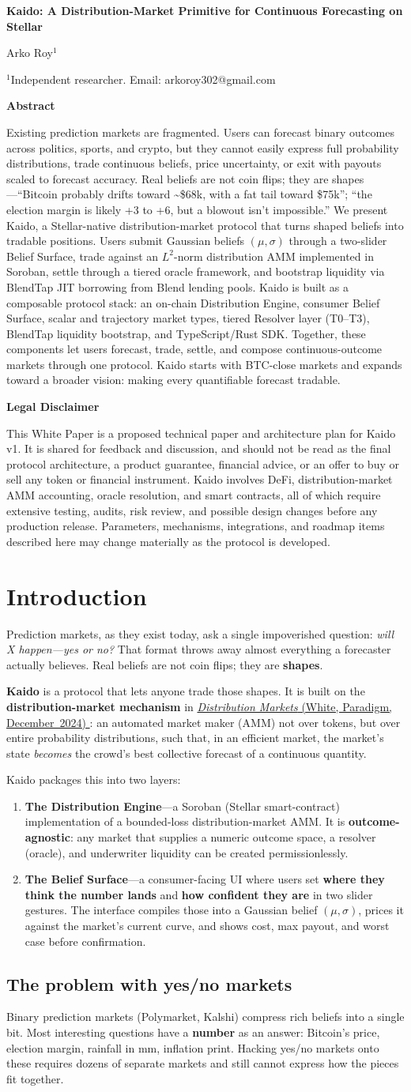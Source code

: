 \documentclass{portalciencia}
\author{
Arko Roy$^{1}$
}
\date{
$^{1}$Independent researcher. Email: arkoroy302@gmail.com
}
\makeatletter
\newcommand{\paradigmdistribution}{%
  \href{https://www.paradigm.xyz/2024/12/distribution-markets}{%
    \emph{Distribution Markets} (White, Paradigm, December~2024)%
  }%
}
\newcommand{\kaidoabstracttext}{%
Existing prediction markets are fragmented. Users can forecast binary outcomes across politics, sports, and crypto, but they cannot easily express full probability distributions, trade continuous beliefs, price uncertainty, or exit with payouts scaled to forecast accuracy. Real beliefs are not coin flips; they are shapes---``Bitcoin probably drifts toward \textasciitilde\$68k, with a fat tail toward \$75k''; ``the election margin is likely +3 to +6, but a blowout isn't impossible.'' We present Kaido, a Stellar-native distribution-market protocol that turns shaped beliefs into tradable positions. Users submit Gaussian beliefs $(\mu, \sigma)$ through a two-slider Belief Surface, trade against an $L^2$-norm distribution AMM implemented in Soroban, settle through a tiered oracle framework, and bootstrap liquidity via BlendTap JIT borrowing from Blend lending pools. Kaido is built as a composable protocol stack: an on-chain Distribution Engine, consumer Belief Surface, scalar and trajectory market types, tiered Resolver layer (T0--T3), BlendTap liquidity bootstrap, and TypeScript/Rust SDK. Together, these components let users forecast, trade, settle, and compose continuous-outcome markets through one protocol. Kaido starts with BTC-close markets and expands toward a broader vision: making every quantifiable forecast tradable.%
}
\newcommand{\kaidodisclaimertext}{%
This White Paper is a proposed technical paper and architecture plan for Kaido v1. It is shared for feedback and discussion, and should not be read as the final protocol architecture, a product guarantee, financial advice, or an offer to buy or sell any token or financial instrument. Kaido involves DeFi, distribution-market AMM accounting, oracle resolution, and smart contracts, all of which require extensive testing, audits, risk review, and possible design changes before any production release. Parameters, mechanisms, integrations, and roadmap items described here may change materially as the protocol is developed.%
}
\newcommand{\kaidomaketitle}{%
  \begin{titlepage}
    \thispagestyle{empty}
    \vspace*{1.2cm}
    \begin{center}
      {\LARGE\bfseries Kaido: A Distribution-Market Primitive for Continuous Forecasting on Stellar\par}
      \vspace{1.2em}
      {\large Arko Roy$^{1}$\par}
      \vspace{0.5em}
      {\normalsize $^{1}$Independent researcher. Email: arkoroy302@gmail.com\par}
    \end{center}
    \vspace{2.2em}
    \begin{center}
      {\large\bfseries Abstract\par}
    \end{center}
    \vspace{0.6em}
    \begin{center}
      \begin{minipage}{0.92\textwidth}
        \justifying
        \kaidoabstracttext
      \end{minipage}
    \end{center}
    \vspace{1.8em}
    \begin{center}
      {\large\bfseries Legal Disclaimer\par}
    \end{center}
    \vspace{0.6em}
    \begin{center}
      \begin{minipage}{0.92\textwidth}
        \small
        \justifying
        \kaidodisclaimertext
      \end{minipage}
    \end{center}
    \vfill
  \end{titlepage}
}
\makeatother
\begin{document}
\kaidomaketitle

\setcounter{tocdepth}{2}

\begingroup
\hypersetup{linkcolor=black}
\tableofcontents
\endgroup
\clearpage

\section{Introduction}

Prediction markets, as they exist today, ask a single impoverished question: \emph{will X happen---yes or no?} That format throws away almost everything a forecaster actually believes. Real beliefs are not coin flips; they are \textbf{shapes}.

\textbf{Kaido} is a protocol that lets anyone trade those shapes. It is built on the \textbf{distribution-market mechanism} in \paradigmdistribution: an automated market maker (AMM) not over tokens, but over entire probability distributions, such that, in an efficient market, the market's state \emph{becomes} the crowd's best collective forecast of a continuous quantity.

Kaido packages this into two layers:

\begin{enumerate}
  \item \textbf{The Distribution Engine}---a Soroban (Stellar smart-contract) implementation of a bounded-loss distribution-market AMM. It is \textbf{outcome-agnostic}: any market that supplies a numeric outcome space, a resolver (oracle), and underwriter liquidity can be created permissionlessly.
  \item \textbf{The Belief Surface}---a consumer-facing UI where users set \textbf{where they think the number lands} and \textbf{how confident they are} in two slider gestures. The interface compiles those into a Gaussian belief $(\mu, \sigma)$, prices it against the market's current curve, and shows cost, max payout, and worst case before confirmation.
\end{enumerate}

\subsection{The problem with yes/no markets}

Binary prediction markets (Polymarket, Kalshi) compress rich beliefs into a single bit. Most interesting questions have a \textbf{number} as an answer: Bitcoin's price, election margin, rainfall in mm, inflation print. Hacking yes/no markets onto these requires dozens of separate markets and still cannot express how the pieces fit together.
\end{document}
